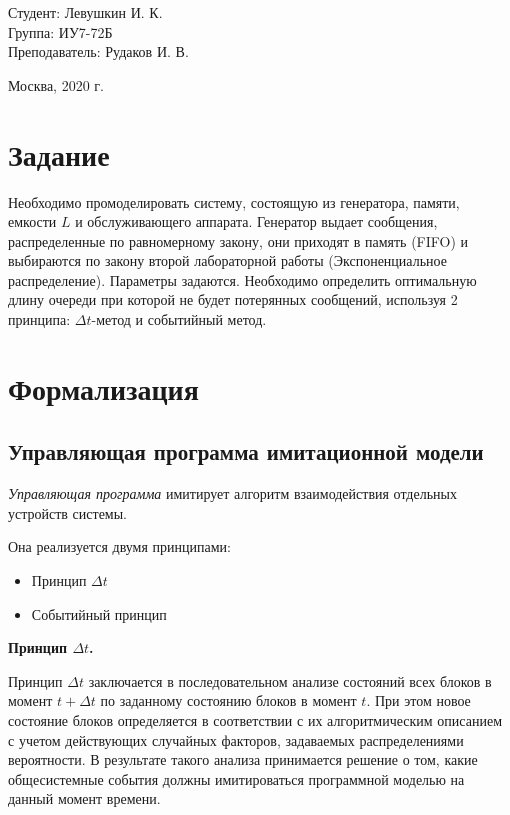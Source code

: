 \documentclass[a4paper,12pt]{article}
\begin{document}
	\large
	\begin{flushright}
		Студент: Левушкин И. К. \\
		Группа: ИУ7-72Б \\
		Преподаватель: Рудаков И. В. \\
	\end{flushright}
	
	\vspace*{25mm}
	\begin{center}
		Москва, 2020 г.  
	\end{center}
	\thispagestyle{empty}
	
	
	\newpage
	
	\section*{Задание}
	
	Необходимо промоделировать систему, состоящую из генератора, памяти, емкости $L$ и обслуживающего аппарата. Генератор выдает сообщения, распределенные по равномерному закону, они приходят в память (FIFO) и выбираются по закону второй лабораторной работы (Экспоненциальное распределение). Параметры задаются. Необходимо определить оптимальную длину очереди при которой не будет потерянных сообщений, используя 2 принципа: $\Delta t$-метод и событийный метод.
	
	\newpage
	
	\section*{Формализация}
	
	\subsection*{Управляющая программа имитационной модели}
	
	\textit{Управляющая программа} имитирует алгоритм взаимодействия отдельных устройств системы.
	
	Она реализуется двумя принципами:
	
	\begin{itemize}
		\item Принцип $\Delta t$
		\item Событийный принцип
	\end{itemize}

	{\bf Принцип $\Delta t$.}
	
	Принцип $\Delta t$ заключается в последовательном анализе состояний всех блоков в момент $t + \Delta t$ по заданному состоянию блоков в момент $t$. При этом новое состояние блоков определяется в соответствии с их алгоритмическим описанием с учетом действующих случайных факторов, задаваемых распределениями вероятности. В результате такого анализа принимается решение о том, какие общесистемные события должны имитироваться программной моделью на данный момент времени. 
	
\end{document}
